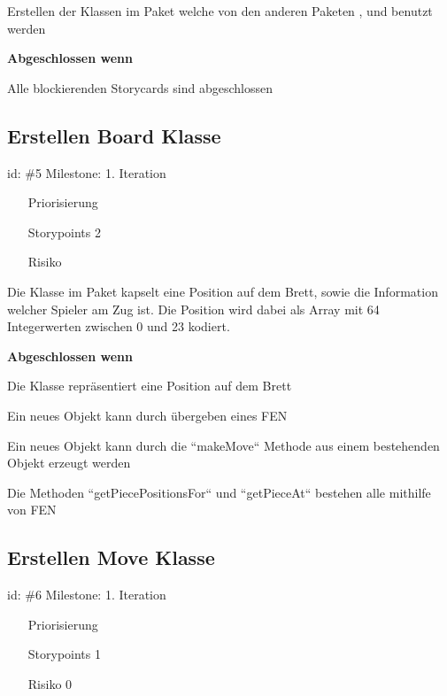 Erstellen der Klassen im Paket  welche von den anderen Paketen ,  und  benutzt werden

\textbf{Abgeschlossen wenn}
\begin{todolist}
    \item  Alle blockierenden Storycards sind abgeschlossen

\end{todolist}

\subsection*{Erstellen Board Klasse}
id: \#5 Milestone: 1. Iteration\\

\begin{itemize}
\item[Priorisierung] 
\item[Storypoints] 2
\item[Risiko] 
\end{itemize}

Die  Klasse im Paket  kapselt eine Position auf dem Brett, sowie die Information welcher Spieler am Zug ist. Die Position wird dabei als Array mit 64 Integerwerten zwischen 0 und 23 kodiert.

\textbf{Abgeschlossen wenn}
\begin{todolist}
    \item[\done]  Die Klasse repräsentiert eine Position auf dem Brett
  \item[\done]  Ein neues Objekt kann durch übergeben eines FEN
  \item[\done]  Ein neues Objekt kann durch die ``makeMove`` Methode aus einem bestehenden Objekt erzeugt werden
  \item[\done]  Die Methoden ``getPiecePositionsFor`` und ``getPieceAt`` bestehen alle mithilfe von FEN

\end{todolist}

\subsection*{Erstellen Move Klasse}
id: \#6 Milestone: 1. Iteration\\

\begin{itemize}
\item[Priorisierung] 
\item[Storypoints] 1
\item[Risiko] 0
\end{itemize}

